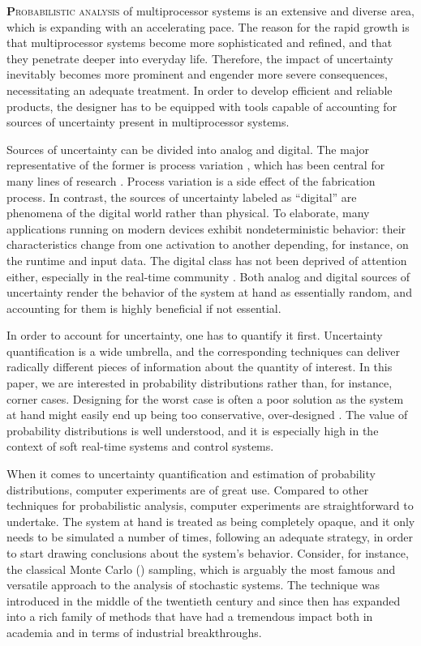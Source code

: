 \lettrine[findent=0.4em, nindent=0em]{\textbf{P}}{robabilistic analysis} of
multiprocessor systems is an extensive and diverse area, which is expanding with
an accelerating pace. The reason for the rapid growth is that multiprocessor
systems become more sophisticated and refined, and that they penetrate deeper
into everyday life. Therefore, the impact of uncertainty inevitably becomes more
prominent and engender more severe consequences, necessitating an adequate
treatment. In order to develop efficient and reliable products, the designer has
to be equipped with tools capable of accounting for sources of uncertainty
present in multiprocessor systems.

Sources of uncertainty can be divided into analog and digital. The major
representative of the former is process variation \cite{srivastava2005}, which
has been central for many lines of research \cite{bhardwaj2008, juan2012,
lee2013, ukhov2014, ukhov2015}. Process variation is a side effect of the
fabrication process. In contrast, the sources of uncertainty labeled as
``digital'' are phenomena of the digital world rather than physical. To
elaborate, many applications running on modern devices exhibit nondeterministic
behavior: their characteristics change from one activation to another depending,
for instance, on the runtime and input data. The digital class has not been
deprived of attention either, especially in the real-time community
\cite{diaz2002, quinton2012, tanasa2015}. Both analog and digital sources of
uncertainty render the behavior of the system at hand as essentially random, and
accounting for them is highly beneficial if not essential.

In order to account for uncertainty, one has to quantify it first. Uncertainty
quantification is a wide umbrella, and the corresponding techniques can deliver
radically different pieces of information about the quantity of interest. In
this paper, we are interested in probability distributions rather than, for
instance, corner cases. Designing for the worst case is often a poor solution as
the system at hand might easily end up being too conservative, over-designed
\cite{quinton2012}. The value of probability distributions is well understood,
and it is especially high in the context of soft real-time systems and control
systems.

When it comes to uncertainty quantification and estimation of probability
distributions, computer experiments \cite{santner2003} are of great use.
Compared to other techniques for probabilistic analysis, computer experiments
are straightforward to undertake. The system at hand is treated as being
completely opaque, and it only needs to be simulated a number of times,
following an adequate strategy, in order to start drawing conclusions about the
system's behavior. Consider, for instance, the classical Monte Carlo ()
sampling, which is arguably the most famous and versatile approach to the
analysis of stochastic systems. The technique was introduced in the middle of
the twentieth century and since then has expanded into a rich family of methods
that have had a tremendous impact both in academia and in terms of industrial
breakthroughs.


